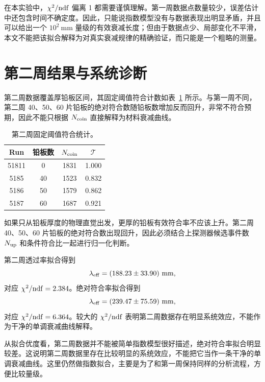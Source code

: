 \documentclass[aps,prl,twocolumn,superscriptaddress,nofootinbib]{revtex4-2}
\begin{document}
在本实验中，$\chi^2/{\rm ndf}$ 偏离 1 都需要谨慎理解。第一周数据点数量较少，误差估计中还包含时间不确定度。因此，只能说指数模型没有与数据表现出明显矛盾，并且可以给出一个 $10^2\ \mathrm{mm}$ 量级的有效衰减长度；但由于数据点少、局部变化不平滑，本文不能把该拟合解释为对真实衰减规律的精确验证，而只能是一个粗略的测量。

\section{第二周结果与系统诊断}

第二周数据覆盖厚铅板区间，其固定阈值符合计数如表~\ref{tab:week2} 所示。与第一周不同，第二周 40、50、60 片铅板的绝对符合数随铅板数增加反而回升，非常不符合预期，因此不能只根据 \(N_{\rm coin}\) 直接解释为材料衰减曲线。

\begin{table}[h]
\caption{第二周固定阈值符合统计。}
\label{tab:week2}
\begin{ruledtabular}
\begin{tabular}{cccc}
Run & 铅板数 & $N_{\rm coin}$ & $\mathcal{T}$\\
\hline
51811 & 0  & 1831 & 1.000\\
5185  & 40 & 1523 & 0.832\\
5186  & 50 & 1579 & 0.862\\
5187  & 60 & 1687 & 0.921\\
\end{tabular}
\end{ruledtabular}
\end{table}

如果只从铅板厚度的物理直觉出发，更厚的铅板有效符合率不应该上升。第二周 40、50、60 片铅板的绝对符合数出现回升，因此必须结合上探测器候选事件数 \(N_{\rm up}\) 和条件符合比一起进行归一化判断。

第二周透过率拟合得到
\begin{equation}
\lambda_{\rm eff}=(188.23\pm33.90)\ \mathrm{mm},
\end{equation}
对应 $\chi^2/{\rm ndf}=2.384$。绝对符合率拟合得到
\begin{equation}
\lambda_{\rm eff}=(239.47\pm75.59)\ \mathrm{mm},
\end{equation}
对应 $\chi^2/{\rm ndf}=6.364$。较大的 $\chi^2/{\rm ndf}$ 表明第二周数据存在明显系统效应，不能作为干净的单调衰减曲线解释。

从拟合优度看，第二周数据并不能被简单指数模型很好描述，绝对符合率拟合明显较差。这说明第二周数据里存在比较明显的系统效应，不能把它当作一条干净的单调衰减曲线。这里仍然做指数拟合，主要是为了和第一周保持同样的分析流程，方便比较量级。
\end{document}

